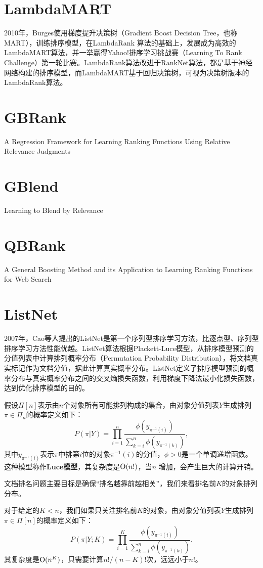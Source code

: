 \section{LambdaMART}
2010年，Burges\cite{burges2010from,ganjisaffar2011bagging}使用梯度提升决策树（Gradient Boost Decision Tree，也称MART），训练排序模型，在LambdaRank 算法的基础上，发展成为高效的LambdaMART算法，并一举赢得Yahoo!排序学习挑战赛（Learning To Rank Challenge）第一轮比赛。LambdaRank算法改进于RankNet算法，都是基于神经网络构建的排序模型，而LambdaMART基于回归决策树，可视为决策树版本的LambdaRank算法。

\section{GBRank}
\cite{zheng2007regression}A Regression Framework for Learning Ranking Functions Using Relative Relevance Judgments

\section{GBlend}
Learning to Blend by Relevance\cite{chen2010learning}

\section{QBRank}
A General Boosting Method and its Application to Learning Ranking Functions for Web Search\cite{zheng2007general}

\section{ListNet}
2007年，Cao等人\cite{cao2007learning}提出的ListNet是第一个序列型排序学习方法，比逐点型、序列型排序学习方法性能优越。ListNet算法根据Plackett-Luce模型，从排序模型预测的分值列表中计算排列概率分布（Permutation Probability Distribution），将文档真实标记作为文档分值，据此计算真实概率分布。ListNet定义了排序模型预测的概率分布与真实概率分布之间的交叉熵损失函数，利用梯度下降法最小化损失函数，达到优化排序模型的目的。

\begin{definition}[排列概率]
假设$\Pi[n]$表示由$n$个对象所有可能排列构成的集合，由对象分值列表$Y$生成排列$\pi\in\Pi_n$的概率定义如下：
\[
    P(\pi|Y) = \prod\limits_{i=1}^n \frac{\phi(y_{\pi^{-1}(i)})}{\sum\limits_{k=i}^n \phi(y_{\pi^{-1}(k)})},
\]
其中$y_{\pi^{-1}(i)}$表示$\pi$中排第$i$位的对象$\pi^{-1}(i)$的分值，$\phi>0$是一个单调递增函数。这种模型称作\textbf{Luce模型}，其复杂度是$\operatorname{\mathrm{O}}(n!)$，当$n$ 增加，会产生巨大的计算开销。
\end{definition}
文档排名问题主要目标是确保“排名越靠前越相关”，我们来看排名前$K$的对象排列分布。
\begin{definition}[TopK概率]
对于给定的$K<n$，我们如果只关注排名前$K$的对象，由对象分值列表$Y$生成排列$\pi\in \Pi[n]$的概率定义如下：
\[
    P(\pi|Y;K) = \prod\limits_{i=1}^K \frac{\phi(y_{\pi^{-1}(i)})}{\sum\limits_{k=i}^n \phi(y_{\pi^{-1}(k)})}.
\]
其复杂度是$\operatorname{\mathrm{O}}(n^K)$，只需要计算$n!/(n-K)!$次，远远小于$n!$。
\end{definition}

